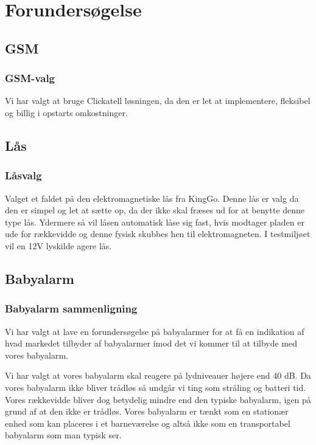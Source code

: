 \chapter{Forundersøgelse}

\section{GSM}

\subsection{GSM-valg}
Vi har valgt at bruge Clickatell løsningen, da den er let at implementere, fleksibel og billig i opstarts omkostninger.

\newpage
\section{Lås}

\subsection{Låsvalg}
Valget et faldet på den elektromagnetiske lås fra KingGo. Denne lås er valg da den er simpel og let at sætte op, da der ikke skal fræses ud for at benytte denne type lås. Ydermere så vil låsen automatisk låse sig fast, hvis modtager pladen er ude for rækkevidde og denne fysisk skubbes hen til elektromagneten. I testmiljøet vil en 12V lyskilde agere lås.

\newpage
\section{Babyalarm}

\subsection{Babyalarm sammenligning}
Vi har valgt at lave en forundersøgelse på babyalarmer for at få en indikation af hvad markedet tilbyder af babyalarmer imod det vi kommer til at tilbyde med vores babyalarm.

Vi har valgt at vores babyalarm skal reagere på lydniveauer højere end 40 dB. Da vores babyalarm ikke bliver trådløs så undgår vi ting som stråling og batteri tid. Vores rækkevidde bliver dog betydelig mindre end den typiske babyalarm, igen på grund af at den ikke er trådløs. Vores babyalarm er tænkt som en stationær enhed som kan placeres i et barneværelse og altså ikke som en transportabel babyalarm som man typisk ser.

